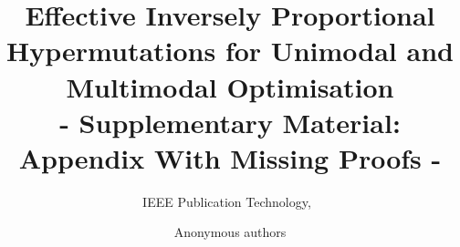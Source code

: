 \documentclass[lettersize,journal]{IEEEtran}
\begin{document}
\title{Effective Inversely Proportional Hypermutations for Unimodal and Multimodal Optimisation\\ - Supplementary Material: Appendix With Missing Proofs -}

\author{IEEE Publication Technology,~	

}
\author{Anonymous authors	

}



\maketitle

%
\end{document}
